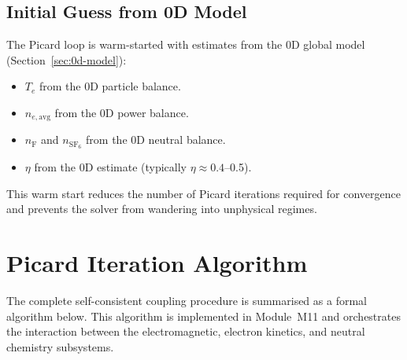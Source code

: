 \documentclass[11pt,a4paper]{report}
\newcommand{\SFsix}{\mathrm{SF}_6}
\newcommand{\Te}{T_e}
\begin{document}
\subsection{Initial Guess from 0D Model}

The Picard loop is warm-started with estimates from the 0D global model (Section~\ref{sec:0d-model}):
\begin{itemize}
  \item $\Te$ from the 0D particle balance.
  \item $n_{e,\mathrm{avg}}$ from the 0D power balance.
  \item $n_\mathrm{F}$ and $n_{\SFsix}$ from the 0D neutral balance.
  \item $\eta$ from the 0D estimate (typically $\eta \approx 0.4$--0.5).
\end{itemize}
This warm start reduces the number of Picard iterations required for convergence and prevents the solver from wandering into unphysical regimes.


\section{Picard Iteration Algorithm}
\label{sec:picard-algorithm}

The complete self-consistent coupling procedure is summarised as a formal algorithm below.  This algorithm is implemented in Module~M11 and orchestrates the interaction between the electromagnetic, electron kinetics, and neutral chemistry subsystems.
\end{document}
